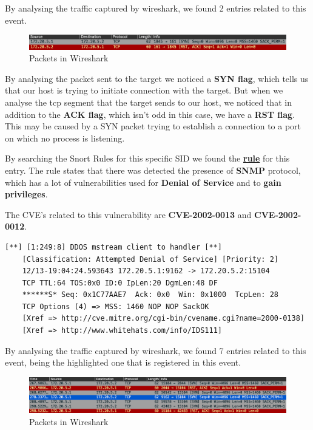 By analysing the traffic captured by wireshark, we found 2 entries related to this event.

\begin{figure}[ht!]
 	\centering
 	\includegraphics[width=1\linewidth]{img/wireshark1.png}
 	\caption{Packets in Wireshark}
\end{figure}

By analysing the packet sent to the target we noticed a \textbf{SYN flag}, which tells us that our host is trying to initiate connection with the target. But when we analyse the tcp segment that the target sends to our host, we noticed that in addition to the \textbf{ACK flag}, which isn't odd in this case, we have a \textbf{RST flag}. This may be caused by a  SYN packet trying to establish a connection to a port on which no process is listening. 

By searching the Snort Rules for this specific SID we found the \textbf{\href{https://www.snort.org/rule_docs/1-1418}{rule}} for this entry. The rule states that there was detected the presence of \textbf{SNMP} protocol, which has a lot of vulnerabilities used for \textbf{Denial of Service} and to \textbf{gain privileges}.

The CVE's related to this vulnerability are \textbf{CVE-2002-0013} and \textbf{CVE-2002-0012}. \\

\begin{lstlisting}[basicstyle=\scriptsize]
    [**] [1:249:8] DDOS mstream client to handler [**]
    [Classification: Attempted Denial of Service] [Priority: 2] 
    12/13-19:04:24.593643 172.20.5.1:9162 -> 172.20.5.2:15104
    TCP TTL:64 TOS:0x0 ID:0 IpLen:20 DgmLen:48 DF
    ******S* Seq: 0x1C77AAE7  Ack: 0x0  Win: 0x1000  TcpLen: 28
    TCP Options (4) => MSS: 1460 NOP NOP SackOK 
    [Xref => http://cve.mitre.org/cgi-bin/cvename.cgi?name=2000-0138]
    [Xref => http://www.whitehats.com/info/IDS111]
\end{lstlisting}

By analysing the traffic captured by wireshark, we found 7 entries related to this event, being the highlighted one that is registered in this event.

\begin{figure}[ht!]
 	\centering
 	\includegraphics[width=1\linewidth]{img/wireshark2.png}
 	\caption{Packets in Wireshark}
\end{figure}

